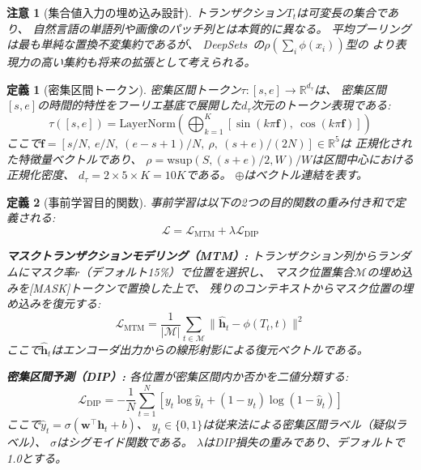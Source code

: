 \documentclass[sigconf,nonacm]{acmart}
\newtheorem{definition}{定義}
\newtheorem{remark}{注意}
\begin{document}
\begin{remark}[集合値入力の埋め込み設計]
\label{rem:set-embedding}
トランザクション$T_t$は可変長の集合であり、
自然言語の単語列や画像のパッチ列とは本質的に異なる。
平均プーリングは最も単純な置換不変集約であるが、
DeepSets~\cite{zaheer2017deep}の$\rho(\sum_i \phi(x_i))$型の
より表現力の高い集約も将来の拡張として考えられる。
\end{remark}

\begin{definition}[密集区間トークン]
\label{def:dense-interval-token}
密集区間トークン$\tau: [s, e] \to \mathbb{R}^{d_\tau}$は、
密集区間$[s, e]$の時間的特性をフーリエ基底で展開した$d_\tau$次元のトークン表現である:
\begin{equation}
    \tau([s, e]) = \text{LayerNorm}\left(\bigoplus_{k=1}^{K}\left[\sin(k\pi \mathbf{f}),\ \cos(k\pi \mathbf{f})\right]\right)
\end{equation}
ここで$\mathbf{f} = [s/N,\ e/N,\ (e-s+1)/N,\ \rho,\ (s+e)/(2N)] \in \mathbb{R}^5$は
正規化された特徴量ベクトルであり、
$\rho = \text{wsup}(S, (s+e)/2, W) / W$は区間中心における正規化密度、
$d_\tau = 2 \times 5 \times K = 10K$である。
$\oplus$はベクトル連結を表す。
\end{definition}

\begin{definition}[事前学習目的関数]
\label{def:pretraining-objective}
事前学習は以下の2つの目的関数の重み付き和で定義される:
\begin{equation}
    \mathcal{L} = \mathcal{L}_{\text{MTM}} + \lambda \mathcal{L}_{\text{DIP}}
\end{equation}

\textbf{マスクトランザクションモデリング（MTM）:}
トランザクション列からランダムにマスク率$r$（デフォルト15\%）で位置を選択し、
マスク位置集合$\mathcal{M}$の埋め込みを[MASK]トークンで置換した上で、
残りのコンテキストからマスク位置の埋め込みを復元する:
\begin{equation}
    \mathcal{L}_{\text{MTM}} = \frac{1}{|\mathcal{M}|}\sum_{t \in \mathcal{M}} \|\hat{\mathbf{h}}_t - \phi(T_t, t)\|^2
\end{equation}
ここで$\hat{\mathbf{h}}_t$はエンコーダ出力からの線形射影による復元ベクトルである。

\textbf{密集区間予測（DIP）:}
各位置が密集区間内か否かを二値分類する:
\begin{equation}
    \mathcal{L}_{\text{DIP}} = -\frac{1}{N}\sum_{t=1}^{N}\left[y_t \log \hat{y}_t + (1-y_t)\log(1 - \hat{y}_t)\right]
\end{equation}
ここで$\hat{y}_t = \sigma(\mathbf{w}^\top \mathbf{h}_t + b)$、
$y_t \in \{0, 1\}$は従来法による密集区間ラベル（疑似ラベル）、
$\sigma$はシグモイド関数である。
$\lambda$はDIP損失の重みであり、デフォルトで1.0とする。
\end{definition}
\end{document}
